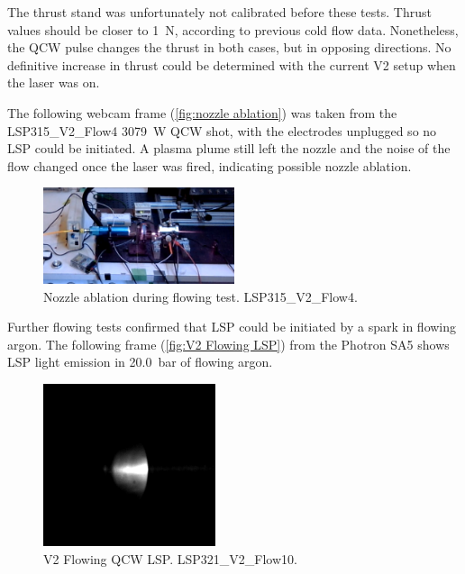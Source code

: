         The thrust stand was unfortunately not calibrated before these tests. Thrust values should be closer to \qty{1}{N}, according to previous cold flow data. Nonetheless, the QCW pulse changes the thrust in both cases, but in opposing directions. No definitive increase in thrust could be determined with the current V2 setup when the laser was on.

        The following webcam frame (\autoref{fig:nozzle ablation}) was taken from the LSP315\_V2\_Flow4 \qty{3079}{W} QCW shot, with the electrodes unplugged so no LSP could be initiated. A plasma plume still left the nozzle and the noise of the flow changed once the laser was fired, indicating possible nozzle ablation.

        \begin{figure}[!ht]
            \centering
            \includegraphics[width=0.5\textwidth]{assets/5 discussion/Nozzle ablation.png}
            \caption{Nozzle ablation during flowing test. LSP315\_V2\_Flow4.}
            \label{fig:nozzle ablation}
        \end{figure}

        Further flowing tests confirmed that LSP could be initiated by a spark in flowing argon. The following frame (\autoref{fig:V2 Flowing LSP}) from the Photron SA5 shows LSP light emission in \qty{20.0}{bar} of flowing argon.

        \begin{figure}[!ht]
            \centering
            \includegraphics[width=0.45\textwidth]{assets/4 experiments/LSP321_V2_FLOW10.png}
            \caption{V2 Flowing QCW LSP. LSP321\_V2\_Flow10.}
            \label{fig:V2 Flowing LSP}
        \end{figure}

        



